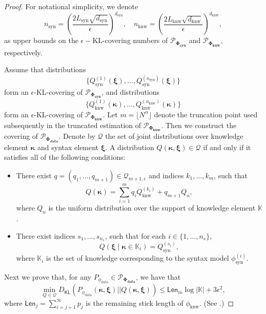 \documentclass[11pt]{article}
\theoremstyle{plain}
\newtheorem{lemma}[theorem]{Lemma}
\theoremstyle{definition}
\newcommand{\DKL}{D_{\mathsf{KL}}}
\newcommand{\dataModel}{\phi_{\text{data}}}
\newcommand{\knwModel}{\phi_{\text{knw}}}
\newcommand{\synModel}{\phi_{\text{syn}}}
\newcommand{\knwfamily}{\mathbf{\Phi_{\text{knw}}}}
\newcommand{\synfamily}{\mathbf{\Phi_{\text{syn}}}}
\newcommand{\datafamily}{\mathbf{\Phi_{\text{data}}}}
\newcommand{\knwprobability}{\mathcal{P}_{\boldsymbol{\Phi_{\text{knw}}}}}
\newcommand{\synprobability}{\mathcal{P}_{\boldsymbol{\Phi_{\text{syn}}}}}
\newcommand{\dataprobability}{\mathcal{P}_{\boldsymbol{\Phi_{\text{data}}}}}
\newcommand{\knwdimension}{d_{\text{knw}}}
\newcommand{\syndimension}{d_{\text{syn}}}
\newcommand{\knwLip}{L_{\text{knw}}}
\newcommand{\synLip}{L_{\text{syn}}}
\newcommand{\syncover}{n_{\text{syn}}}
\newcommand{\knwcover}{n_{\text{knw}}}
\newcommand{\knwset}{\mathbb{K}}
\newcommand{\Len}{\mathsf{Len}}
\newcommand{\Knwelem}{\boldsymbol{\kappa}}
\newcommand{\Synelem}{\boldsymbol{\xi}}
\begin{document}
\begin{proof}
For notational simplicity, we denote
\[
\syncover = \left(\frac{2\synLip\sqrt{\syndimension}}{\epsilon}\right)^{\syndimension}, \quad 
\knwcover = \left(\frac{2\knwLip\sqrt{\knwdimension}}{\epsilon}\right)^{\knwdimension},
\]
as upper bounds on the $\epsilon-$KL-covering numbers of $\synprobability$ and $\knwprobability$, respectively.

Assume that distributions 
\[
\{Q_{\text{syn}}^{(1)}(\Synelem), \dots, Q_{\text{syn}}^{(\syncover)}(\Synelem)\}
\] 
form an $\epsilon$-KL-covering of $\mathcal{P}_{\synfamily}$, and distributions 
\[
\{Q_{\text{knw}}^{(1)}(\Knwelem), \dots, Q_{\text{knw}}^{(\knwcover)}(\Knwelem)\}
\] 
form an $\epsilon$-KL-covering of $\mathcal{P}_{\knwfamily}$.
Let $m = \lfloor N^{\alpha} \rfloor$ denote the truncation point used subsequently in the truncated estimation of $\knwprobability$.
Then we construct the covering of $\dataprobability$.
Denote by $\mathcal{Q}$ the set of joint distributions over knowledge element $\Knwelem$ and syntax element $\Synelem$.
A distribution $Q(\Knwelem,\Synelem)\in \mathcal{Q}$ if and only if it satisfies all of the following conditions:

\begin{itemize}
    \item There exist $q = (q_1,\dots,q_{m+1})\in \mathcal{Q}_{m+1,\epsilon}$ and indices $k_1,\dots,k_{m}$, such that
    \[
    Q(\Knwelem)=\sum\limits_{i=1}^{m} q_i Q_{\text{knw}}^{(k_i)}+q_{m+1}Q_u,
    \]
    where $Q_u$ is the uniform distribution over the support of knowledge element $\knwset$.

    \item There exist indices $s_1,\dots,s_{n_s}$, such that for each $i\in\{1,\dots,n_s\}$,
    \[
    Q(\Synelem\mid \Knwelem\in \mathbb{K}_i)=Q_{\text{syn}}^{(s_i)},
    \]
    where $\mathbb{K}_i$ is the set of knowledge corresponding to the syntax model $\synModel^{(i)}$.
\end{itemize}


Next we prove that, for any $P_{\dataModel}\in \mathcal{P}_{\datafamily}$, we have that
\[
\min_{Q\in \mathcal{Q}}\DKL(P_{\dataModel}(\Knwelem,\Synelem)||Q(\Knwelem,\Synelem))\le \Len_m\log \mathbb{|K|}+3\epsilon^2,
\]
where $\Len_j=\sum\limits_{i=j+1}^{\infty} p_j$ is the remaining stick length of $\knwModel$. (See .)




\end{proof}
\end{document}
